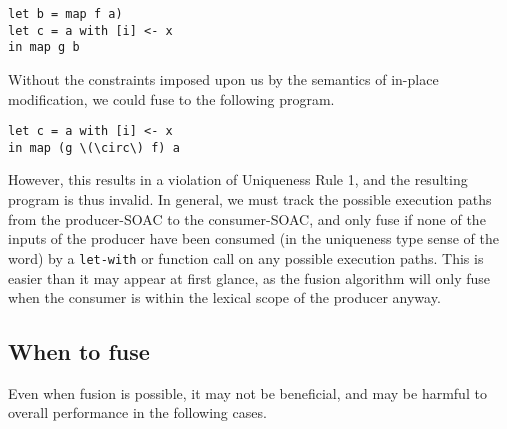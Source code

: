 \begin{lstlisting}
let b = map f a)
let c = a with [i] <- x
in map g b
\end{lstlisting}

Without the constraints imposed upon us by the semantics of in-place
modification, we could fuse to the following program.

\begin{lstlisting}[mathescape]
let c = a with [i] <- x
in map (g \(\circ\) f) a
\end{lstlisting}

However, this results in a violation of Uniqueness Rule 1, and the
resulting program is thus invalid.  In general, we must track the
possible execution paths from the producer-SOAC to the consumer-SOAC,
and only fuse if none of the inputs of the producer have been consumed
(in the uniqueness type sense of the word) by a \lstinline{let-with} or
function call on any possible execution paths.  This is easier than it
may appear at first glance, as the fusion algorithm will only fuse
when the consumer is within the lexical scope of the producer anyway.

\subsection{When to fuse}
\label{sec:whentofuse}

Even when fusion is possible, it may not be beneficial, and may be
harmful to overall performance in the following cases.

